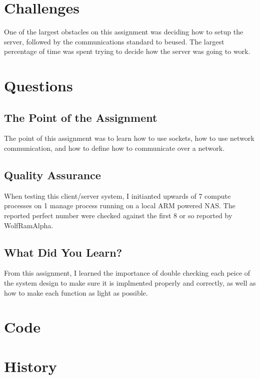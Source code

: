 \documentclass[letterpaper,10pt,titlepage]{article}
\begin{document}
\section{Challenges}
\label{Overcoming Project challenges}
One of the largest obstacles on this assignment was deciding how to setup the server, followed by the communications standard to beused. The largest percentage of time was spent trying to decide how the server was going to work.

\section{Questions}
\label{Project Quesions}
\subsection{The Point of the Assignment}
\label{Point}
The point of this assignment was to learn how to use sockets, how to use network communication, and how to define how to communicate over a network.
\subsection{Quality Assurance}
\label{QA}
When testing this client/server system, I initianted upwards of 7 compute processes on 1 manage process running on a local ARM powered NAS. The reported perfect number were checked against the first 8 or so reported by WolfRamAlpha.
\subsection{What Did You Learn?}
\label{Learned}
From this assignment, I learned the importance of double checking each peice of the system design to make sure it is implmented properly and correctly, as well as how to make each function as light as possible.


\section{Code}
\label{myar Source Code}




\section{History}
\end{document}
